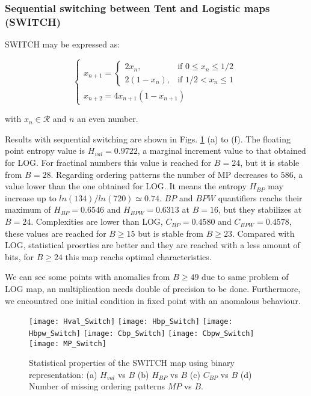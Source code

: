 \subsubsection{Sequential switching between Tent and Logistic maps (SWITCH)} \label{sssec:switch}

SWITCH may be expressed as:

\begin{equation}
\begin{cases}
	x_{n+1}=
	\begin{cases}
		2x_n, & \mbox{if } 0\leq x_n\leq 1/2 \\
		2(1-x_n ), & \mbox{if } 1/2<x_n\leq 1
	\end{cases} \\
	x_{n+2}=4x_{n+1}(1-x_{n+1})
\end{cases}\label{eq:SWITCH}
\end{equation}

with $x_n\in\mathcal{R}$ and $n$ an even number.

Results with sequential switching are shown in Figs. \ref{fig:SWITCH_QuantiB} (a) to (f).
The floating point entropy value is $H_{val}=0.9722$, a marginal increment value to that obtained for LOG. 
For fractinal numbers this value is reached for $B=24$, but it is stable from $B=28$.
Regarding ordering patterns the number of MP decreases to $586$, a value lower than the one obtained for LOG.
It means the entropy $H_{BP}$ may increase up to $ln(134)/ln(720)\simeq 0.74$.
$BP$ and $BPW$ quantifiers reachs their maximum of $H_{BP}=0.6546$ and $H_{BPW}=0.6313$ at $B=16$, but they stabilizes at $B=24$.
Complexities are lower than LOG, $C_{BP}=0.4580$ and $C_{BPW}=0.4578$, these values are reached for $B \geq 15$ but is stable from $B \geq 23$.
Compared with LOG, statistical proerties are better and they are reached with a less amount of bits, for $B \geq 24$ this map reachs optimal characteristics.

We can see some points with anomalies from $B \geq 49$ due to same problem of LOG map, an multiplication needs double of precision to be done.
Furthermore, we encountred one initial condition in fixed point with an anomalous behaviour.

\begin{figure}
	\texttt{[image: Hval\_Switch]}
	\texttt{[image: Hbp\_Switch]}
	\texttt{[image: Hbpw\_Switch]}
	\texttt{[image: Cbp\_Switch]}
	\texttt{[image: Cbpw\_Switch]}
	\texttt{[image: MP\_Switch]}
	\caption{Statistical properties of the SWITCH map using binary representation: (a) $H_{val}$ vs $B$ (b) $H_{BP}$ vs $B$ (c) $C_{BP}$ vs $B$ (d) Number of missing ordering patterns $MP$ vs $B$.}
	\label{fig:SWITCH_QuantiB}
\end{figure}

